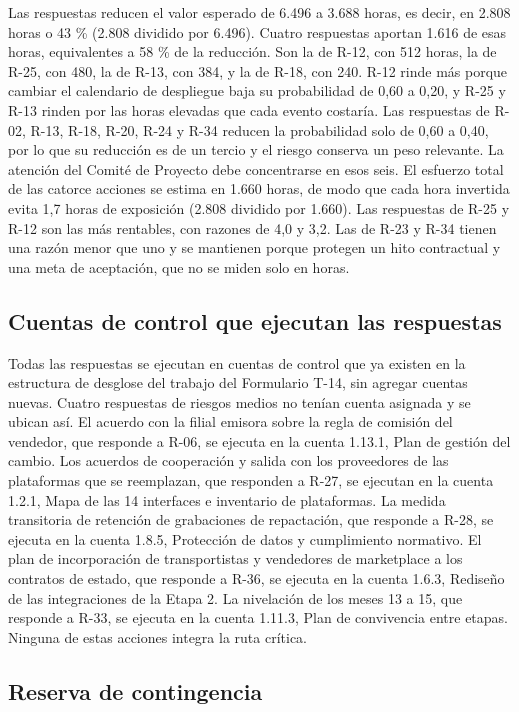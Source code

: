 \documentclass[11pt]{article}
\begin{document}
Las respuestas reducen el valor esperado de 6.496 a 3.688 horas, es decir, en 2.808 horas o 43 \% (2.808 dividido por 6.496). Cuatro respuestas aportan 1.616 de esas horas, equivalentes a 58 \% de la reducción. Son la de R-12, con 512 horas, la de R-25, con 480, la de R-13, con 384, y la de R-18, con 240. R-12 rinde más porque cambiar el calendario de despliegue baja su probabilidad de 0,60 a 0,20, y R-25 y R-13 rinden por las horas elevadas que cada evento costaría. Las respuestas de R-02, R-13, R-18, R-20, R-24 y R-34 reducen la probabilidad solo de 0,60 a 0,40, por lo que su reducción es de un tercio y el riesgo conserva un peso relevante. La atención del Comité de Proyecto debe concentrarse en esos seis. El esfuerzo total de las catorce acciones se estima en 1.660 horas, de modo que cada hora invertida evita 1,7 horas de exposición (2.808 dividido por 1.660). Las respuestas de R-25 y R-12 son las más rentables, con razones de 4,0 y 3,2. Las de R-23 y R-34 tienen una razón menor que uno y se mantienen porque protegen un hito contractual y una meta de aceptación, que no se miden solo en horas.

\subsection{Cuentas de control que ejecutan las respuestas}

Todas las respuestas se ejecutan en cuentas de control que ya existen en la estructura de desglose del trabajo del Formulario T-14, sin agregar cuentas nuevas. Cuatro respuestas de riesgos medios no tenían cuenta asignada y se ubican así. El acuerdo con la filial emisora sobre la regla de comisión del vendedor, que responde a R-06, se ejecuta en la cuenta 1.13.1, Plan de gestión del cambio. Los acuerdos de cooperación y salida con los proveedores de las plataformas que se reemplazan, que responden a R-27, se ejecutan en la cuenta 1.2.1, Mapa de las 14 interfaces e inventario de plataformas. La medida transitoria de retención de grabaciones de repactación, que responde a R-28, se ejecuta en la cuenta 1.8.5, Protección de datos y cumplimiento normativo. El plan de incorporación de transportistas y vendedores de marketplace a los contratos de estado, que responde a R-36, se ejecuta en la cuenta 1.6.3, Rediseño de las integraciones de la Etapa 2. La nivelación de los meses 13 a 15, que responde a R-33, se ejecuta en la cuenta 1.11.3, Plan de convivencia entre etapas. Ninguna de estas acciones integra la ruta crítica.

\subsection{Reserva de contingencia}
\end{document}
